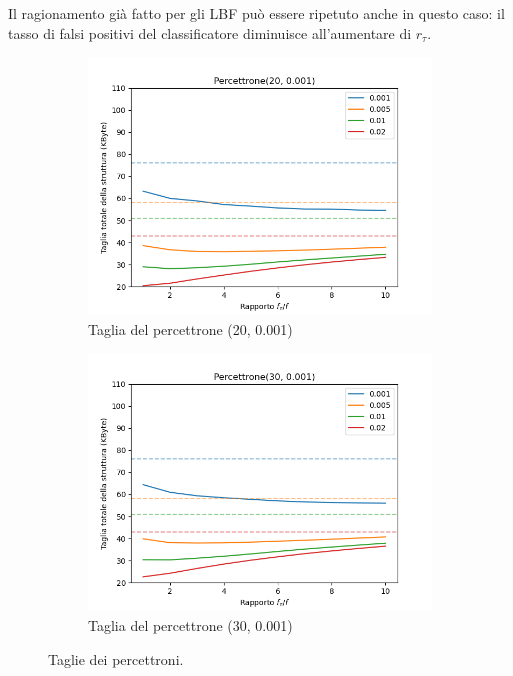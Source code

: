 \documentclass[../../main.tex]{subfiles}
\begin{document}
    Il ragionamento già fatto per gli LBF può essere ripetuto anche in questo caso: il tasso di falsi positivi del classificatore diminuisce all'aumentare di $r_{\tau}$.

    \begin{figure}[H]
        \centering
        \begin{subfigure}[b]{0.49\textwidth}
            \centering
            \includegraphics[width = \textwidth]{immagini/7/SLBF/Percettrone(20, 0.001)_Taglia.png}
            \caption{Taglia del percettrone (20, 0.001)}
            \label{fig:SLBFTagliaPercettrone20}
        \end{subfigure}
        \begin{subfigure}[b]{0.49\textwidth}
            \centering
            \includegraphics[width = \textwidth]{immagini/7/SLBF/Percettrone(30, 0.001)_Taglia.png}
            \caption{Taglia del percettrone (30, 0.001)}
            \label{fig:SLBFTagliaPercettrone30}
        \end{subfigure}
        \caption{Taglie dei percettroni.}
        \label{fig:tagliePercettroniSLBF}
    \end{figure}
\end{document}
